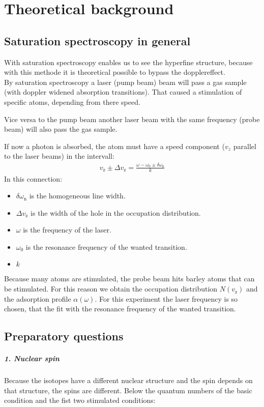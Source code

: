 \chapter{Theoretical background}

\section{Saturation spectroscopy in general}
With saturation spectroscopy enables us to see the hyperfine structure, because with this methode it is theoretical possible to bypass the dopplereffect. \\
By saturation spectroscopy a laser (pump beam) beam will pass a gas sample (with doppler widened absorption transitions). That caused a stimulation of specific atoms, depending from there speed. 

Vice versa to the pump beam another laser beam with the same frequency (probe beam) will also pass the gas sample.

If now a photon is absorbed, the atom must have a speed component ($v_z$ parallel to the laser beams) in the intervall: 
\begin{align}
    v_{\text{z}} \pm \Delta v_{\text{z}} = \frac{\omega -\omega_0 \pm \delta \omega_{\text{n}}}{k}
\end{align}
In this connection: 
\begin{itemize} 
    \item $\delta \omega_{\text{n}}$ is the homogeneous line width.
    \item $\Delta v_{\text{z}}$ is the width of the hole in the occupation distribution.
    \item $\omega$ is the frequency of the laser.
    \item $\omega_0$ is the resonance frequency of the wanted transition.
    \item $k$ 
\end{itemize}

Because many atoms are stimulated, the probe beam hits barley atoms that can be stimulated. For this reason we obtain the occupation distribution $N(v_{\text{z}})$ and the adsorption profile $\alpha(\omega)$. For this experiment the laser frequency is so chosen, that the fit with the resonance frequency of the wanted transition.

\section{Preparatory questions}

\paragraph{1. Nuclear spin}
Because the isotopes have a different nuclear structure and the spin depends on that structure, the spins are different. Below the quantum numbers of the basic condition and the fist two stimulated conditions: 